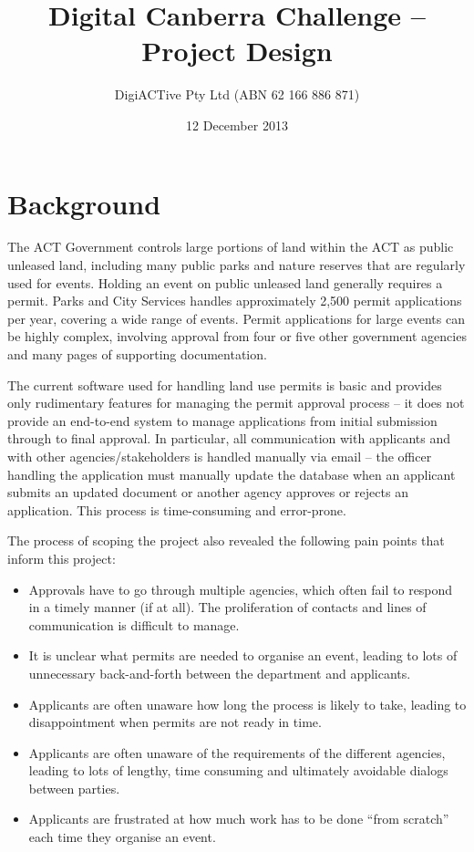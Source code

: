 \documentclass[12pt,a4paper,twosided]{article}
\title{Digital Canberra Challenge -- Project Design}
\author{DigiACTive Pty Ltd (ABN 62 166 886 871)}
\date{12 December 2013}
\begin{document}
\maketitle
\section{Background}

The ACT Government controls large portions of land within the ACT as
public unleased land, including many public parks and nature reserves
that are regularly used for events. Holding an event on public unleased
land generally requires a permit. Parks and City Services handles
approximately 2,500 permit applications per year, covering a wide range
of events. Permit applications for large events can be highly complex,
involving approval from four or five other government agencies and many
pages of supporting documentation.

The current software used for handling land use permits is basic and
provides only rudimentary features for managing the permit approval
process -- it does not provide an end-to-end system to manage
applications from initial submission through to final approval. In
particular, all communication with applicants and with other
agencies/stakeholders is handled manually via email -- the officer
handling the application must manually update the database when an
applicant submits an updated document or another agency approves or
rejects an application. This process is time-consuming and error-prone.

The process of scoping the project also revealed the following pain
points that inform this project:

\begin{itemize}
\itemsep1pt\parskip0pt
\item
  Approvals have to go through multiple agencies, which often fail to
  respond in a timely manner (if at all). The proliferation of contacts
  and lines of communication is difficult to manage.
\item
  It is unclear what permits are needed to organise an event, leading to
  lots of unnecessary back-and-forth between the department and
  applicants.
\item
  Applicants are often unaware how long the process is likely to take,
  leading to disappointment when permits are not ready in time.
\item
  Applicants are often unaware of the requirements of the different
  agencies, leading to lots of lengthy, time consuming and ultimately
  avoidable dialogs between parties.
\item
  Applicants are frustrated at how much work has to be done ``from
  scratch'' each time they organise an event.
\end{itemize}
\end{document}
